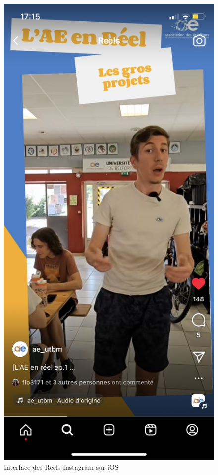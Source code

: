 \begin{figure}[!h]
    \begin{center}
        \includegraphics[scale=0.2]{ressources/interfaceInsta}
        \caption{Interface des Reels Instagram sur iOS \label{fig:interfaceInsta}}
    \end{center}
\end{figure}

